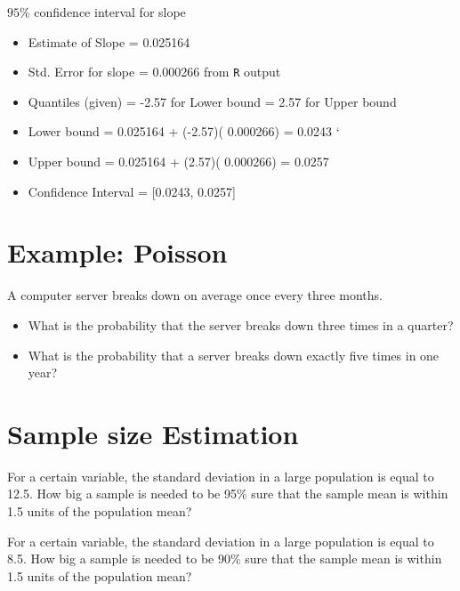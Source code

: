 \documentclass[12pt, a4paper]{report}
\theoremstyle{plain}
\theoremstyle{definition}
\theoremstyle{remark}
\begin{document}
$95\%$ confidence interval for slope
\begin{itemize}
\item Estimate of Slope     = 	0.025164
\item Std. Error for slope 	= 	0.000266 from \texttt{R} output
\item Quantiles (given) 	=	-2.57 	for Lower bound
				            =   2.57  	for Upper bound

\item Lower bound		=	0.025164 + (-2.57)( 0.000266)
				=	0.0243
`
\item Upper bound		=	0.025164 + (2.57)( 0.000266)
				=	0.0257

\item Confidence Interval = [0.0243, 0.0257]
\end{itemize}












\section{Example: Poisson}

A computer server breaks down on average once every three months.

\begin{itemize}
\item What is the probability that the server breaks down three times in a quarter?
\item What is the probability that a server breaks down exactly five times in one year?
\end{itemize}




\section{Sample size Estimation}
For a certain variable, the standard deviation in a large population is equal to 12.5.
How big a sample is needed to be 95\% sure that the sample mean is within 1.5 units of the population mean?


For a certain variable, the standard deviation in a large population is equal to 8.5.
How big a sample is needed to be 90\% sure that the sample mean is within 1.5
units of the population mean?
\end{document}
